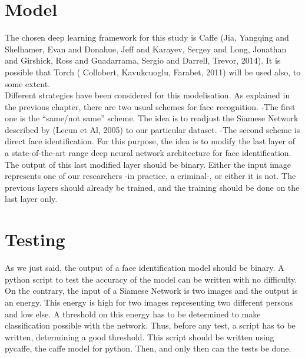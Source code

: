 \section{Model}

The chosen deep learning framework for this study is Caffe (Jia, Yangqing and Shelhamer, Evan and Donahue, Jeff and Karayev, Sergey and Long, Jonathan and Girshick, Ross and Guadarrama, Sergio and Darrell, Trevor, 2014). It is possible that Torch ( Collobert, Kavukcuoglu, Farabet, 2011) will be used also, to some extent.\\

Different strategies have been considered for this modelisation. As explained in the previous chapter, there are two usual schemes for face recognition.\newline
-The first one is the \enquote{same/not same} scheme. The idea is to readjust the Siamese Network described by (Lecun et Al, 2005) to our particular dataset.\newline
-The second scheme is direct face identification. For this purpose, the idea is to modify the last layer of a state-of-the-art range deep neural network architecture for face identification. The output of this last modified layer should be binary. Either the input image represents one of our researchers -in practice, a criminal-, or either it is not. The previous layers should already be trained, and the training should be done on the last layer only.

\section{Testing}

As we just said, the output of a face identification model should be binary. A python script to test the accuracy of the model can be written with no difficulty. On the contrary, the input of a Siamese Network is two images and the output is an energy. This energy is high for two images representing two different persons and low else. A threshold on this energy has to be determined to make classification possible with the network. Thus, before any test, a script has to be written, determining a good threshold. This script should be written using pycaffe, the caffe model for python. Then, and only then can the tests be done.

